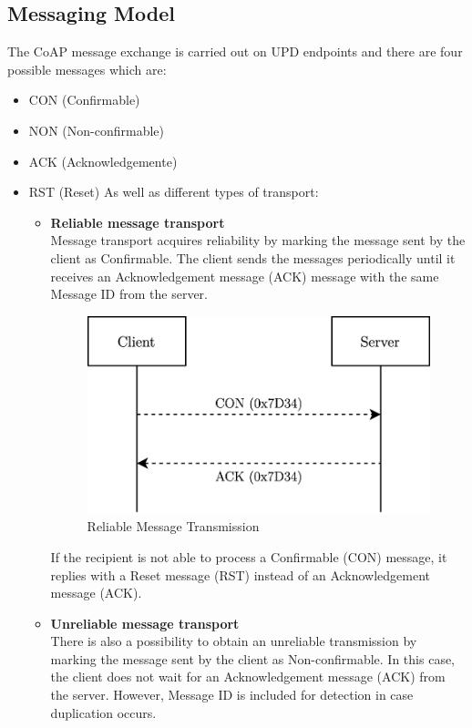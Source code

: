 \documentclass[11pt]{book}
\begin{document}
\subsection{Messaging Model}
The CoAP message exchange is carried out on UPD endpoints and there are four possible messages which are: \begin{itemize}
\item CON (Confirmable)
\item NON (Non-confirmable)
\item ACK (Acknowledgemente)
\item RST (Reset)
As well as different types of transport:
\begin{itemize}
\item \textbf{Reliable message transport}\\
Message transport acquires reliability by marking the message sent by the client as Confirmable. The client sends the messages periodically until it receives an Acknowledgement message (ACK) message with the same Message ID from the server. 
\begin{figure}[H]
	\centering
	\includegraphics [scale=0.175] {messagingmodel.png}
	\caption{Reliable Message Transmission}
\end{figure}
If the recipient is not able to process a Confirmable (CON) message, it replies with a Reset message (RST) instead of an Acknowledgement message (ACK).
\item \textbf{Unreliable message transport}\\
There is also a possibility to obtain an unreliable transmission by marking the message sent by the client as Non-confirmable. In this case, the client does not wait for an Acknowledgement message (ACK) from the server. However, Message ID is included for detection in case duplication occurs. 
\begin{figure}[H]

\end{figure}
\end{itemize}
\end{itemize}
\end{document}
